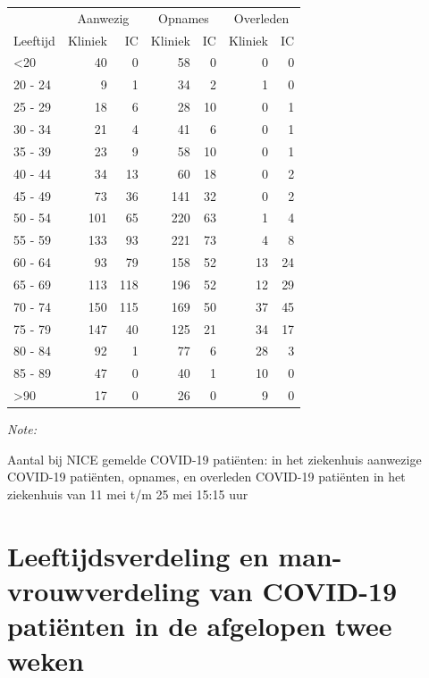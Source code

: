 \documentclass[
  english,
  man,floatsintext]{apa6}
\begin{document}
\begin{table}
\centering\begingroup\fontsize{10}{12}\selectfont

\begin{threeparttable}
\begin{tabular}{lrrrrrr}
\toprule
\multicolumn{1}{c}{ } & \multicolumn{2}{c}{Aanwezig} & \multicolumn{2}{c}{Opnames} & \multicolumn{2}{c}{Overleden} \\
\cmidrule(l{3pt}r{3pt}){2-3} \cmidrule(l{3pt}r{3pt}){4-5} \cmidrule(l{3pt}r{3pt}){6-7}
Leeftijd & Kliniek & IC & Kliniek & IC & Kliniek & IC\\
\midrule
<20 & 40 & 0 & 58 & 0 & 0 & 0\\
20 - 24 & 9 & 1 & 34 & 2 & 1 & 0\\
25 - 29 & 18 & 6 & 28 & 10 & 0 & 1\\
30 - 34 & 21 & 4 & 41 & 6 & 0 & 1\\
35 - 39 & 23 & 9 & 58 & 10 & 0 & 1\\
40 - 44 & 34 & 13 & 60 & 18 & 0 & 2\\
45 - 49 & 73 & 36 & 141 & 32 & 0 & 2\\
50 - 54 & 101 & 65 & 220 & 63 & 1 & 4\\
55 - 59 & 133 & 93 & 221 & 73 & 4 & 8\\
60 - 64 & 93 & 79 & 158 & 52 & 13 & 24\\
65 - 69 & 113 & 118 & 196 & 52 & 12 & 29\\
70 - 74 & 150 & 115 & 169 & 50 & 37 & 45\\
75 - 79 & 147 & 40 & 125 & 21 & 34 & 17\\
80 - 84 & 92 & 1 & 77 & 6 & 28 & 3\\
85 - 89 & 47 & 0 & 40 & 1 & 10 & 0\\
>90 & 17 & 0 & 26 & 0 & 9 & 0\\
\bottomrule
\end{tabular}
\begin{tablenotes}
\item \textit{Note: } 
\item Aantal bij NICE gemelde COVID-19 patiënten: in het ziekenhuis aanwezige COVID-19 patiënten, opnames, en overleden COVID-19 patiënten in het ziekenhuis van 11 mei t/m 25 mei 15:15 uur
\end{tablenotes}
\end{threeparttable}
\endgroup{}
\end{table}

\newpage

\hypertarget{leeftijdsverdeling-en-man-vrouwverdeling-van-covid-19-patiuxebnten-in-de-afgelopen-twee-weken}{%
\section{Leeftijdsverdeling en man-vrouwverdeling van COVID-19 patiënten in de afgelopen twee weken}\label{leeftijdsverdeling-en-man-vrouwverdeling-van-covid-19-patiuxebnten-in-de-afgelopen-twee-weken}}
\end{document}
